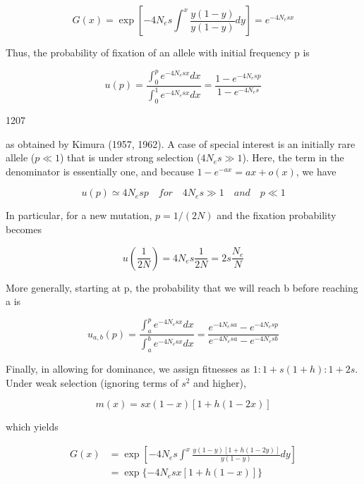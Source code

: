 \documentclass{article}
\begin{document}
\begin{equation}
G(x)=\exp\left[-4N_{e}s\int_{}^{x}\frac{y(1-y)}{y(1-y)}d y\right]=e^{-4N_{e}s x}
\end{equation}

Thus, the probability of fixation of an allele with initial frequency p is

\begin{equation}
u(p)=\frac{\int_{0}^{p}e^{-4N_{e}s x}d x}{\int_{0}^{1}e^{-4N_{e}s x}d x}=\frac{1-e^{-4N_{e}s p}}{1-e^{-4N_{e}s}}
\end{equation}

1207

as obtained by Kimura (1957, 1962). A case of special interest is an initially rare allele ($p \ll 1$) that is under strong selection ($4N_e s \gg 1$). Here, the term in the denominator is essentially one, and because $1 - e^{-ax} = ax + o(x)$, we have

\begin{equation}
u(p)\simeq4N_{e}sp\quad for\quad4N_{e}s\gg1\quad and\quad p\ll1
\end{equation}

In particular, for a new mutation,  $ p = 1/(2N) $ and the fixation probability becomes

\begin{equation}
u\left(\frac{1}{2N}\right)=4N_{e}s\frac{1}{2N}=2s\frac{N_{e}}{N}
\end{equation}

More generally, starting at p, the probability that we will reach b before reaching a is

\begin{equation}
u_{a,b}(p)=\frac{\int_{a}^{p}e^{-4N_{e}s x}d x}{\int_{a}^{b}e^{-4N_{e}s x}d x}=\frac{e^{-4N_{e}s a}-e^{-4N_{e}s p}}{e^{-4N_{e}s a}-e^{-4N_{e}s b}}
\end{equation}

Finally, in allowing for dominance, we assign fitnesses as  $ 1:1 + s(1 + h):1 + 2s $. Under weak selection (ignoring terms of  $ s^{2} $ and higher),

\begin{equation}
m(x)=s x(1-x)[1+h(1-2x)]
\end{equation}

which yields

\begin{equation}
\begin{aligned}G(x)&=\exp\left[-4N_{e}s\int_{}^{x}\frac{y(1-y)[1+h(1-2y)]}{y(1-y)}dy\right]\\&=\exp\{-4N_{e}s x[1+h(1-x)]\}\end{aligned}
\end{equation}
\end{document}
